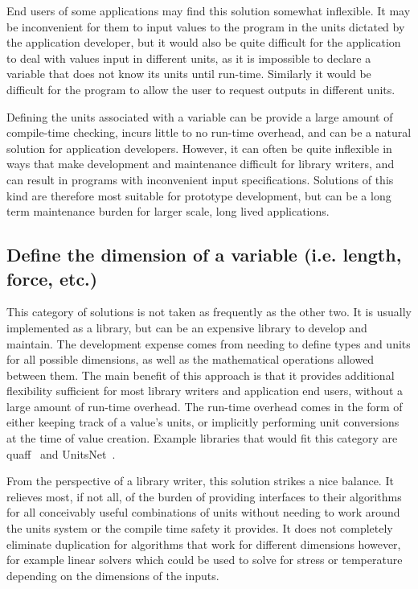 \documentclass{article}
\begin{document}
End users of some applications may find this solution somewhat inflexible.
It may be inconvenient for them to input values to the program in the units dictated by the application developer,
but it would also be quite difficult for the application to deal with values input in different units,
as it is impossible to declare a variable that does not know its units until run-time.
Similarly it would be difficult for the program to allow the user to request outputs in different units.

Defining the units associated with a variable can be provide a large amount of compile-time checking,
incurs little to no run-time overhead, and can be a natural solution for application developers.
However, it can often be quite inflexible in ways that make development and maintenance difficult for library writers,
and can result in programs with inconvenient input specifications.
Solutions of this kind are therefore most suitable for prototype development,
but can be a long term maintenance burden for larger scale, long lived applications.

\subsection{Define the dimension of a variable (i.e. length, force, etc.)}
\label{static-dimensions}

This category of solutions is not taken as frequently as the other two.
It is usually implemented as a library, but can be an expensive library to develop and maintain.
The development expense comes from needing to define types and units for all possible dimensions,
as well as the mathematical operations allowed between them.
The main benefit of this approach is that it provides additional flexibility sufficient for most library writers
and application end users, without a large amount of run-time overhead.
The run-time overhead comes in the form of either keeping track of a value's units,
or implicitly performing unit conversions at the time of value creation.
Example libraries that would fit this category are quaff~\cite{QuaffFortranPackage} and UnitsNet~\cite{Larsen2021}.

From the perspective of a library writer, this solution strikes a nice balance.
It relieves most, if not all, of the burden of providing interfaces to their algorithms for all conceivably useful combinations of units without needing to work around the units system or the compile time safety it provides.
It does not completely eliminate duplication for algorithms that work for different dimensions however,
for example linear solvers which could be used to solve for stress or temperature depending on the dimensions of the inputs.
\end{document}

